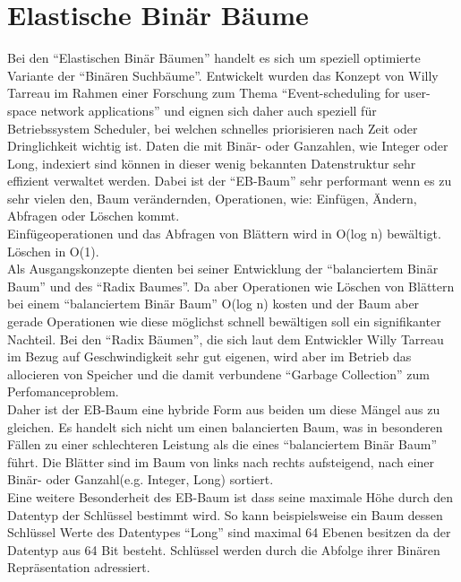 \documentclass[a4paper,11pt,oneside,%
headsepline,												%
footsepline,												%
bibtotocnumbered									%
]{scrreprt}
\begin{document}
\section{Elastische Binär Bäume}
Bei den \enquote{Elastischen Binär Bäumen} handelt es sich um speziell optimierte Variante der \enquote{Binären Suchbäume}. Entwickelt wurden das Konzept von Willy Tarreau\autocite{Tarreau} im Rahmen einer Forschung zum Thema \enquote{Event-scheduling for user-space network applications} und eignen sich daher auch speziell für Betriebssystem Scheduler, bei welchen schnelles priorisieren nach Zeit oder Dringlichkeit wichtig ist. Daten die mit Binär- oder Ganzahlen, wie Integer oder Long, indexiert sind können in dieser wenig bekannten Datenstruktur sehr effizient verwaltet werden. Dabei ist der \enquote{\ac{EB-Baum}} sehr performant wenn es zu sehr vielen den, Baum verändernden, Operationen, wie: Einfügen, Ändern, Abfragen oder Löschen kommt.\\
Einfügeoperationen und das Abfragen von Blättern wird in O(log n) bewältigt. Löschen in O(1).\\
Als Ausgangskonzepte dienten bei seiner Entwicklung der \enquote{balanciertem Binär Baum} und des \enquote{Radix Baumes}. Da aber Operationen wie Löschen von Blättern bei einem \enquote{balanciertem Binär Baum} O(log n) kosten und der Baum aber gerade Operationen wie diese möglichst schnell bewältigen soll ein signifikanter Nachteil. Bei den \enquote{Radix Bäumen}, die sich laut dem Entwickler Willy Tarreau\autocite[Absatz Introduction]{Tarreau} im Bezug auf Geschwindigkeit sehr gut eigenen, wird aber im Betrieb das allocieren von Speicher und die damit verbundene \enquote{Garbage Collection} zum Perfomanceproblem.\\
Daher ist der \ac{EB-Baum} eine hybride Form aus beiden um diese Mängel aus zu gleichen. Es handelt sich nicht um einen balancierten Baum, was in besonderen Fällen zu einer schlechteren Leistung als die eines \enquote{balanciertem Binär Baum} führt. Die Blätter sind im Baum von links nach rechts aufsteigend, nach einer Binär- oder Ganzahl(e.g. Integer, Long) sortiert.\\
Eine weitere Besonderheit des \ac{EB-Baum} ist dass seine maximale Höhe durch den Datentyp der Schlüssel bestimmt wird.
So kann beispielsweise ein Baum dessen Schlüssel Werte des Datentypes \enquote{Long} sind maximal 64 Ebenen besitzen da der Datentyp aus 64 Bit besteht. Schlüssel werden durch die Abfolge ihrer Binären Repräsentation adressiert.
\end{document}
